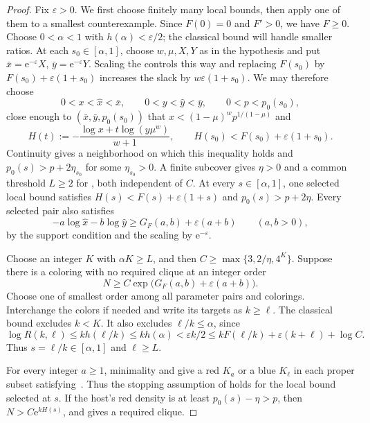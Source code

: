 \documentclass[11pt]{article}
\theoremstyle{definition}
\newcommand{\e}{\mathrm e}
\begin{document}
\begin{proof}
Fix \(\varepsilon>0\). We first choose finitely many local bounds, then apply one of them to a smallest counterexample.
Since \(F(0)=0\) and \(F'>0\), we have \(F\ge0\).
Choose \(0<\alpha<1\) with \(h(\alpha)<\varepsilon/2\); the classical bound will handle smaller ratios.
At each \(s_0\in[\alpha,1]\), choose \(w,\mu,X,Y\) as in the hypothesis and put \(\bar x=\e^{-\varepsilon}X\), \(\bar y=\e^{-\varepsilon}Y\).
Scaling the controls this way and replacing \(F(s_0)\) by \(F(s_0)+\varepsilon(1+s_0)\) increases the slack by \(w\varepsilon(1+s_0)\).
We may therefore choose
\[
 0<x<\widehat x<\bar x,\qquad
 0<y<\widehat y<\bar y,\qquad 0<p<p_0(s_0),
\]
close enough to \((\bar x,\bar y,p_0(s_0))\) that \(x<(1-\mu)^wp^{1/(1-\mu)}\) and
\[
 H(t):=-\frac{\log x+t\log(y\mu^w)}{w+1},\qquad
 H(s_0)<F(s_0)+\varepsilon(1+s_0).
\]
Continuity gives a neighborhood on which this inequality holds and \(p_0(s)>p+2\eta_{s_0}\) for some \(\eta_{s_0}>0\).
A finite subcover gives \(\eta>0\) and a common threshold \(L\ge2\) for , both independent of \(C\).
At every \(s\in[\alpha,1]\), one selected local bound satisfies \(H(s)<F(s)+\varepsilon(1+s)\) and \(p_0(s)>p+2\eta\).
Every selected pair also satisfies
\begin{equation}\label{eq:majorant}
 -a\log\widehat x-b\log\widehat y
 \ge G_F(a,b)+\varepsilon(a+b)\qquad(a,b>0),
\end{equation}
by the support condition and the scaling by \(\e^{-\varepsilon}\).

Choose an integer \(K\) with \(\alpha K\ge L\), and then \(C\ge\max\{3,2/\eta,4^K\}\). Suppose there is a coloring with no required clique at an integer order
\[
 N\ge C\exp\bigl(G_F(a,b)+\varepsilon(a+b)\bigr).
\]
Choose one of smallest order among all parameter pairs and colorings. Interchange the colors if needed and write its targets as \(k\ge\ell\). The classical bound \cite{ES} excludes \(k<K\). It also excludes \(\ell/k\le\alpha\), since
\[
 \log R(k,\ell)\le kh(\ell/k)\le kh(\alpha)<\varepsilon k/2
 \le kF(\ell/k)+\varepsilon(k+\ell)+\log C.
\]
Thus \(s=\ell/k\in[\alpha,1]\) and \(\ell\ge L\).

For every integer \(a\ge1\), minimality and  give a red \(K_a\) or a blue \(K_\ell\) in each proper subset satisfying~.
Thus the stopping assumption of  holds for the local bound selected at \(s\).
If the host's red density is at least \(p_0(s)-\eta>p\), then \(N>C\e^{kH(s)}\), and  gives a required clique.


\end{proof}
\end{document}
